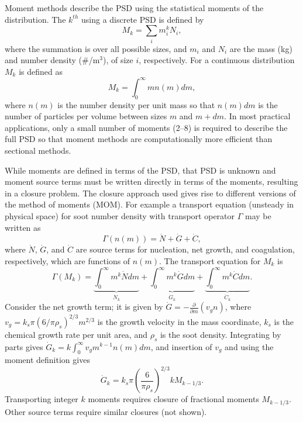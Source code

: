 \documentclass[preprint,letterpaper]{elsarticle}
\newcommand{\prtl}[2]{\frac{\partial #1}{\partial #2}}
\begin{document}
Moment methods describe the PSD using the statistical moments of the distribution. The $k^{th}$ using a discrete PSD is defined by
%
\begin{equation}
    M_k = \sum_i m_i^kN_i,
\end{equation}
%
where the summation is over all possible sizes, and $m_i$ and $N_i$ are the mass (kg) and number density (\#/m$^3$), of size $i$, respectively. For a continuous distribution $M_k$ is defined as
%
\begin{equation} \label{e:mk}
    M_k = \int_0^\infty mn(m)dm,
\end{equation}
%
where $n(m)$ is the number density per unit mass so that $n(m)dm$ is the number of particles per volume between sizes $m$ and $m+dm$.
In most practical applications, only a small number of moments (2--8) is required to describe the full PSD so that moment methods are computationally more efficient than sectional methods. 

While moments are defined in terms of the PSD, that PSD is unknown and moment source terms must be written directly in terms of the moments, resulting in a closure problem. The closure approach used gives rise to different versions of the method of moments (MOM). For example a transport equation (unsteady in physical space) for soot number density with transport operator $\Gamma$ may be written
as
%
\begin{equation}
    \Gamma(n(m)) = \dot{N} + \dot{G} + \dot{C},
\end{equation}
%
where $\dot{N}$, $\dot{G}$, and $\dot{C}$ are source terms for nucleation, net growth, and coagulation, respectively, which are functions of $n(m)$. The transport equation for $M_k$ is 
%
\begin{equation}
    \Gamma(M_k) = \underbrace{\int_0^\infty m^k\dot{N}dm}_{\dot{N}_k} + 
    \underbrace{\int_0^\infty m^k\dot{G}dm}_{\dot{G}_k}+ 
    \underbrace{\int_0^\infty m^k\dot{C}dm}_{\dot{C}_k}.
\end{equation}
%
Consider the net growth term; it is given by $\dot{G} = -\prtl{ }{m}(v_gn)$, where $v_g=k_s\pi(6/\pi\rho_s)^{2/3}m^{2/3}$ is the growth velocity in the mass coordinate, $k_s$ is the chemical growth rate per unit area, and $\rho_s$ is the soot density. Integrating by parts gives $\dot{G}_k=k\int_0^\infty v_gm^{k-1}n(m)dm$, and insertion of $v_g$ and using the moment definition gives
%
\begin{equation}
    \dot{G}_k = k_s\pi\left(\frac{6}{\pi \rho_s}\right)^{2/3}kM_{k-1/3}.
\end{equation}
%
Transporting integer $k$ moments requires closure of fractional moments $M_{k-1/3}$. Other source terms require similar closures (not shown).
\end{document}
